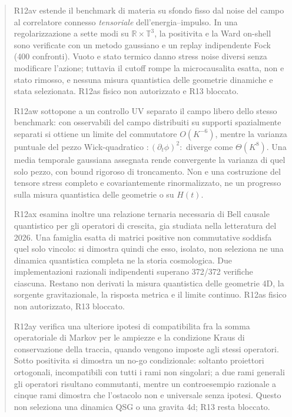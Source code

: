 \documentclass[11pt,a4paper]{article}
\begin{document}
\begin{abstract}
\par\smallskip R12av estende il benchmark di materia su sfondo fisso dal noise del campo al correlatore connesso \emph{tensoriale} dell'energia--impulso. In una regolarizzazione a sette modi su $\mathbb{R}\times\mathbb{T}^3$, la positivita e la Ward on-shell sono verificate con un metodo gaussiano e un replay indipendente Fock (400 confronti). Vuoto e stato termico danno stress noise diversi senza modificare l'azione; tuttavia il cutoff rompe la microcausalita esatta, non e stato rimosso, e nessuna misura quantistica delle geometrie dinamiche e stata selezionata. R12as fisico non autorizzato e R13 bloccato.\par
\par\smallskip R12aw sottopone a un controllo UV separato il campo libero dello stesso benchmark: con osservabili del campo distribuiti su supporti spazialmente separati si ottiene un limite del commutatore $O(K^{-6})$, mentre la varianza puntuale del pezzo Wick-quadratico $:\!(\partial_t\phi)^2\!:$ diverge come $\Theta(K^8)$. Una media temporale gaussiana assegnata rende convergente la varianza di quel solo pezzo, con bound rigoroso di troncamento. Non e una costruzione del tensore stress completo e covariantemente rinormalizzato, ne un progresso sulla misura quantistica delle geometrie o su $H(t)$.\par
\par\smallskip R12ax esamina inoltre una relazione ternaria necessaria di Bell causale quantistico per gli operatori di crescita, gia studiata nella letteratura del 2026. Una famiglia esatta di matrici positive non commutative soddisfa quel solo vincolo: si dimostra quindi che esso, isolato, non seleziona ne una dinamica quantistica completa ne la storia cosmologica. Due implementazioni razionali indipendenti superano 372/372 verifiche ciascuna. Restano non derivati la misura quantistica delle geometrie 4D, la sorgente gravitazionale, la risposta metrica e il limite continuo. R12as fisico non autorizzato, R13 bloccato.\par

\par\smallskip R12ay verifica una ulteriore ipotesi di compatibilita fra la somma operatoriale di Markov per le ampiezze e la condizione Kraus di conservazione della traccia, quando vengono imposte agli stessi operatori. Sotto positivita si dimostra un no-go condizionale: soltanto proiettori ortogonali, incompatibili con tutti i rami non singolari; a due rami generali gli operatori risultano commutanti, mentre un controesempio razionale a cinque rami dimostra che l'ostacolo non e universale senza ipotesi. Questo non seleziona una dinamica QSG o una gravita 4d; R13 resta bloccato.


\end{abstract}
\end{document}
